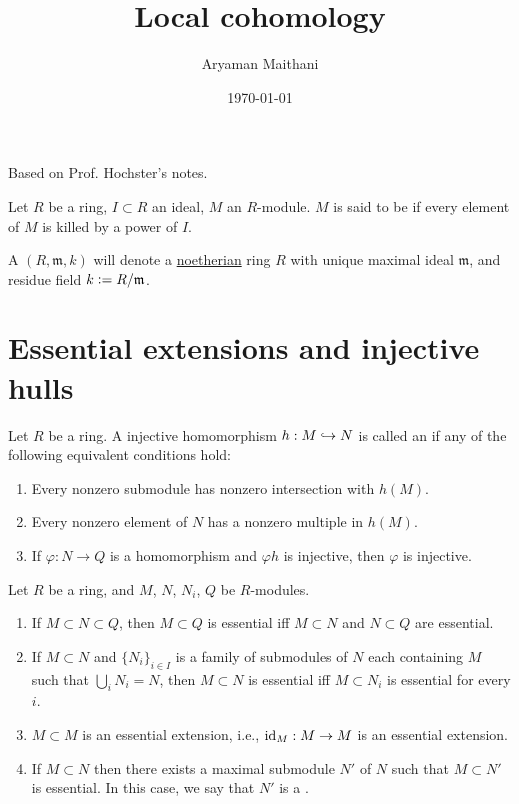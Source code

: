 \documentclass[12pt]{article}
\title{Local cohomology}
\author{Aryaman Maithani}
\date{\today}
\begin{document}
\maketitle
\tableofcontents

Based on Prof. Hochster's notes. 

Let $R$ be a ring, $I \subset R$ an ideal, $M$ an $R$-module. $M$ is said to be  if every element of $M$ is killed by a power of $I$.

A  $(R, \mathfrak{m}, k)$ will denote a \underline{noetherian} ring $R$ with unique maximal ideal $\mathfrak{m}$, and residue field $k \vcentcolon= R/\mathfrak{m}$. \newline

\section{Essential extensions and injective hulls}

\begin{defn}
	Let $R$ be a ring. A injective homomorphism $h : M \hookrightarrow N$ is called an  if any of the following equivalent conditions hold:
	\begin{enumerate}[label=(\alph*)]
	 	\item Every nonzero submodule has nonzero intersection with $h(M)$.
	 	\item Every nonzero element of $N$ has a nonzero multiple in $h(M)$.
	 	\item If $\varphi : N \to Q$ is a homomorphism and $\varphi h$ is injective, then $\varphi$ is injective.
	 \end{enumerate} 
\end{defn}

\begin{prop} \label{prop:essential-extension-basics}
	Let $R$ be a ring, and $M$, $N$, $N_{i}$, $Q$ be $R$-modules.
	\begin{enumerate}[label=(\alph*)]
		\item If $M \subset N \subset Q$, then $M \subset Q$ is essential iff $M \subset N$ and $N \subset Q$ are essential.
		\item If $M \subset N$ and $\{N_{i}\}_{i \in I}$ is a family of submodules of $N$ each containing $M$ such that $\bigcup_{i} N_{i} = N$, then $M \subset N$ is essential iff $M \subset N_{i}$ is essential for every $i$.
		\item $M \subset M$ is an essential extension, i.e., $\operatorname{id}_{M} : M \to M$ is an essential extension.
		\item If $M \subset N$ then there exists a maximal submodule $N'$ of $N$ such that $M \subset N'$ is essential. In this case, we say that $N'$ is a . 
	\end{enumerate}
\end{prop}
\end{document}
